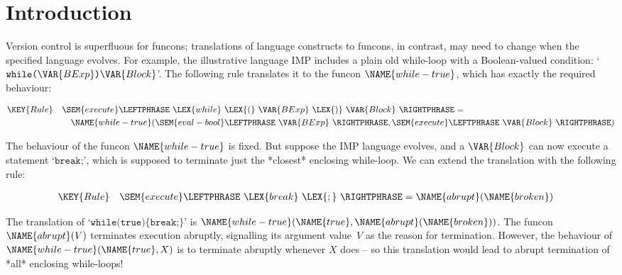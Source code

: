 \begin{abstract}
The body of this document consists of fragments of the published article.
It is for use in testing the formatting of mathematical formulae
in paragraphs, inline displays, and floating figures by \LaTeX\ and MathJax.
\end{abstract}

\section*{Introduction}

Version control is superfluous for funcons;
translations of language constructs to funcons, in contrast, may need to change
when the specified language evolves.
For example, the illustrative language IMP includes a plain old while-loop
with a Boolean-valued condition:
`$\texttt{while} \texttt{(} \VAR{BExp} \texttt{)} \VAR{Block}$'.
The following rule translates it to the funcon $\NAME{while-true}$,
which has exactly the required behaviour:


\begin{align*}
  \KEY{Rule} \quad
    & \SEM{execute} \LEFTPHRASE \
        \LEX{while} \ \LEX{(} \ \VAR{BExp} \ \LEX{)} \ \VAR{Block} \ \RIGHTPHRASE  = \\&\quad
      \NAME{while-true}
        (  \SEM{eval-bool} \LEFTPHRASE \ \VAR{BExp} \ \RIGHTPHRASE , 
               \SEM{execute} \LEFTPHRASE \ \VAR{Block} \ \RIGHTPHRASE  )
\end{align*}


The behaviour of the funcon $\NAME{while-true}$ is fixed.
But suppose the IMP language evolves,
and a $\VAR{Block}$ can now execute a statement `$\texttt{break;}$',
which is supposed to terminate just the *closest* enclosing while-loop.
We can extend the translation with the following rule:


\begin{align*}
  \KEY{Rule} \quad
    & \SEM{execute} \LEFTPHRASE \ \LEX{break} \ \LEX{;} \ \RIGHTPHRASE  = 
      \NAME{abrupt}(\NAME{broken})
\end{align*}


The translation of `$\texttt{while(true)\{break;\}}$' is 
$\NAME{while-true}(\NAME{true}, \NAME{abrupt}(\NAME{broken}))$.
The funcon $\NAME{abrupt}(V)$ terminates execution abruptly,
signalling its argument value~$V$ as the reason for termination.
However, the behaviour of $\NAME{while-true}(\NAME{true}, X)$ is to terminate abruptly whenever $X$ does
-- so this translation would lead to abrupt termination of *all* enclosing while-loops!

